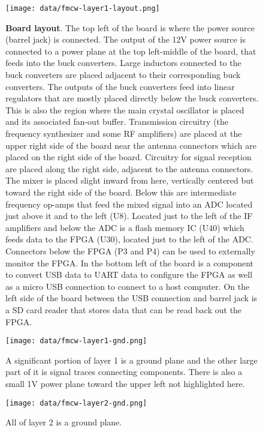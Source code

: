 \documentclass{default}
\begin{document}
\begin{figure}[h]
  \centering
  \texttt{[image: data/fmcw-layer1-layout.png]}
  \caption{\textbf{Board layout}. The top left of the board is where the power source (barrel jack)
    is connected. The output of the 12V power source is connected to a power plane at the top
    left-middle of the board, that feeds into the buck converters. Large inductors connected to the
    buck converters are placed adjacent to their corresponding buck converters. The outputs of the
    buck converters feed into linear regulators that are mostly placed directly below the buck
    converters. This is also the region where the main crystal oscillator is placed and its
    associated fan-out buffer. Transmission circuitry (the frequency synthesizer and some RF
    amplifiers) are placed at the upper right side of the board near the antenna connectors which
    are placed on the right side of the board. Circuitry for signal reception are placed along the
    right side, adjacent to the antenna connectors. The mixer is placed slight inward from here,
    vertically centered but toward the right side of the board. Below this are intermediate
    frequency op-amps that feed the mixed signal into an ADC located just above it and to the left
    (U8). Located just to the left of the IF amplifiers and below the ADC is a flash memory IC (U40)
    which feeds data to the FPGA (U30), located just to the left of the ADC. Connectors below the
    FPGA (P3 and P4) can be used to externally monitor the FPGA. In the bottom left of the board is
    a component to convert USB data to UART data to configure the FPGA as well as a micro USB
    connection to connect to a host computer. On the left side of the board between the USB
    connection and barrel jack is a SD card reader that stores data that can be read back out the
    FPGA.}
  \label{fig:fmcw-layer1-layout}
\end{figure}

\begin{figure}[h]
  \centering
  \texttt{[image: data/fmcw-layer1-gnd.png]}
  \caption{A significant portion of layer 1 is a ground plane and the other large part of it is
    signal traces connecting components. There is also a small 1V power plane toward the upper left
    not highlighted here.}
  \label{fig:fmcw-layer1-gnd}
\end{figure}

\begin{figure}[h]
  \centering
  \texttt{[image: data/fmcw-layer2-gnd.png]}
  \caption{All of layer 2 is a ground plane.}
  \label{fig:fmcw-layer2-gnd}
\end{figure}
\end{document}
